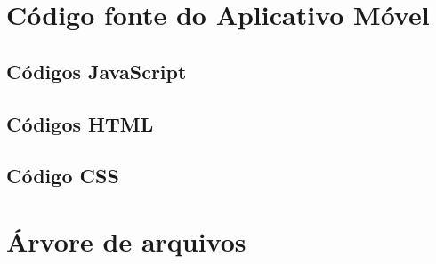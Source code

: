 \chapter{Código fonte do Aplicativo Móvel}\label{anexo:sources-mobile}
\section{Códigos JavaScript}




\section{Códigos HTML}










\section{Código CSS}


\chapter{Árvore de arquivos}

